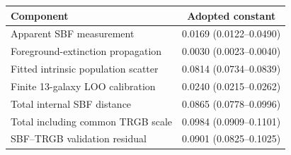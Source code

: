 \begin{tabular}{lc}
\toprule
Component & Adopted constant \\
\midrule
Apparent SBF measurement & 0.0169 (0.0122--0.0490) \\
Foreground-extinction propagation & 0.0030 (0.0023--0.0040) \\
Fitted intrinsic population scatter & 0.0814 (0.0734--0.0839) \\
Finite 13-galaxy LOO calibration & 0.0240 (0.0215--0.0262) \\
Total internal SBF distance & 0.0865 (0.0778--0.0996) \\
Total including common TRGB scale & 0.0984 (0.0909--0.1101) \\
SBF--TRGB validation residual & 0.0901 (0.0825--0.1025) \\
\bottomrule
\end{tabular}
